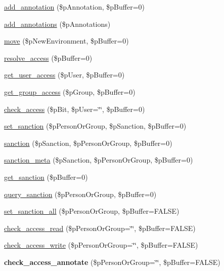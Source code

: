 \begin{DoxyCompactItemize}
\item 
\hyperlink{classsteam__object_a48498bb032cbbf6f43f6078c42595dbf}{add\_\-annotation} (\$pAnnotation, \$pBuffer=0)
\item 
\hyperlink{classsteam__object_a4eb334e867b824ab8c0d562dc709f940}{add\_\-annotations} (\$pAnnotations)
\item 
\hyperlink{classsteam__object_a60f451fe8ede21cb125a2f57000a2e88}{move} (\$pNewEnvironment, \$pBuffer=0)
\item 
\hyperlink{classsteam__object_ad6ea820f7d7f4be56301172cba35427d}{resolve\_\-access} (\$pBuffer=0)
\item 
\hyperlink{classsteam__object_a60c5d04286bc7fd84bb16a129f928518}{get\_\-user\_\-access} (\$pUser, \$pBuffer=0)
\item 
\hyperlink{classsteam__object_a582953d5f9db295cd8fe4313e413ad03}{get\_\-group\_\-access} (\$pGroup, \$pBuffer=0)
\item 
\hyperlink{classsteam__object_a3cb9a8ec9278181a53c5ed16fd9a0664}{check\_\-access} (\$pBit, \$pUser=\char`\"{}\char`\"{}, \$pBuffer=0)
\item 
\hyperlink{classsteam__object_a42fac96a649284ee4dde44c2895daf16}{set\_\-sanction} (\$pPersonOrGroup, \$pSanction, \$pBuffer=0)
\item 
\hyperlink{classsteam__object_a3caa7656517b6123d99e8de782274c90}{sanction} (\$pSanction, \$pPersonOrGroup, \$pBuffer=0)
\item 
\hyperlink{classsteam__object_a37727495bf9b676f58754ea90d8243f3}{sanction\_\-meta} (\$pSanction, \$pPersonOrGroup, \$pBuffer=0)
\item 
\hyperlink{classsteam__object_a9370168ef18787384c6f3a58693fb988}{get\_\-sanction} (\$pBuffer=0)
\item 
\hyperlink{classsteam__object_a7c58f923023ead1d9ea232707c8cac2b}{query\_\-sanction} (\$pPersonOrGroup, \$pBuffer=0)
\item 
\hyperlink{classsteam__object_af7f46d2f82d574d89b358ffa0b9a0ebf}{set\_\-sanction\_\-all} (\$pPersonOrGroup, \$pBuffer=FALSE)
\item 
\hyperlink{classsteam__object_aeb8bea19bd1b3fa817025000f5846fea}{check\_\-access\_\-read} (\$pPersonOrGroup=\char`\"{}\char`\"{}, \$pBuffer=FALSE)
\item 
\hyperlink{classsteam__object_afab38f221cc044f502a8f55906a34e3e}{check\_\-access\_\-write} (\$pPersonOrGroup=\char`\"{}\char`\"{}, \$pBuffer=FALSE)
\item 
\hypertarget{classsteam__object_af7d79899bf4984daf0b2b4130f1f49d5}{
{\bfseries check\_\-access\_\-annotate} (\$pPersonOrGroup=\char`\"{}\char`\"{}, \$pBuffer=FALSE)}
\label{classsteam__object_af7d79899bf4984daf0b2b4130f1f49d5}


\end{DoxyCompactItemize}
